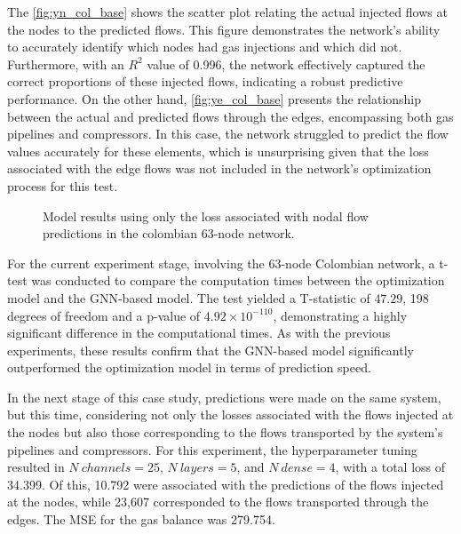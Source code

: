 The \cref{fig:yn_col_base} shows the scatter plot relating the actual injected flows at the nodes to the predicted flows. This figure demonstrates the network's ability to accurately identify which nodes had gas injections and which did not. Furthermore, with an $R^2$ value of 0.996, the network effectively captured the correct proportions of these injected flows, indicating a robust predictive performance. 
On the other hand, \cref{fig:ye_col_base} presents the relationship between the actual and predicted flows through the edges, encompassing both gas pipelines and compressors. In this case, the network struggled to predict the flow values accurately for these elements, which is unsurprising given that the loss associated with the edge flows was not included in the network's optimization process for this test.

\begin{figure}
    \centering
        \setlength{}        
        \setlength{} 
    \caption{Model results using only the loss associated with nodal flow predictions in the colombian 63-node network.}
    \label{fig:lineal_col_base_results}
\end{figure}


For the current experiment stage, involving the 63-node Colombian network, a t-test was conducted to compare the computation times between the optimization model and the GNN-based model. The test yielded a T-statistic of $47.29$, 198 degrees of freedom and a p-value of $4.92 \times 10^{-110}$, demonstrating a highly significant difference in the computational times. As with the previous experiments, these results confirm that the GNN-based model significantly outperformed the optimization model in terms of prediction speed.


In the next stage of this case study, predictions were made on the same system, but this time, considering not only the losses associated with the flows injected at the nodes but also those corresponding to the flows transported by the system's pipelines and compressors. For this experiment, the hyperparameter tuning resulted in $N \ channels = 25$, $N \ layers = 5$, and $N \ dense = 4$, with a total loss of 34.399. Of this, 10.792 were associated with the predictions of the flows injected at the nodes, while 23,607 corresponded to the flows transported through the edges. The MSE for the gas balance was 279.754.

